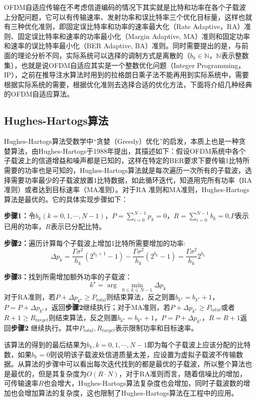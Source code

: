 OFDM自适应传输在不考虑信道编码的情况下其实就是比特和功率在各个子载波上分配问题，它可以有传输速率、发射功率和误比特率三个优化目标量，这样也就有三种优化准则，即固定误比特率和功率的速率最大化（Rate Adaptive，RA）准则、固定误比特率和速率的功率最小化（Margin Adaptive, MA）准则和固定功率和速率的误比特率最小化（BER Adaptive, BA）准则。同时需要提出的是，与前面的理论分析不同，实际系统可以选择的调制方式是离散的（$b_k \in \mathbb{N}$，$\mathbb{N}$表示整数集），也就是说OFDM自适应其实是一个整数优化问题（Integer Programming，IP），之前在推导注水算法时用到的拉格朗日乘子法不能再用到实际系统中，需要根据实际系统的需要，根据优化准则去选择合适的优化方法，下面将介绍几种经典的OFDM自适应算法。
\subsection{Hughes-Hartogs算法}
Hughes-Hartogs算法\cite{hughes1989ensemble}受数学中“贪婪（Greedy）优化”的启发，本质上也是一种贪婪算法，由Hughes-Hartogs于1988年提出，其描述如下：假设OFDM系统中各个子载波上的信道增益和噪声都是已知的，这样在特定的BER要求下要传输1比特所需要的功率也是可知的，Hughes-Hartogs算法就是每次遍历一次所有的子载波，选择需要功率最少的子载波放置1比特数据，如此循环迭代，知道用完所有功率（RA准则）或者达到目标速率（MA准则）。对于RA 准则和MA准则，Hughes-Hartogs算法是最优的。它的具体实现步骤如下：
\begin{description}
\item{\bf{步骤1：}}令$b_k(k=0,1,\cdots,N-1)$，$P=\sum_{i=0}^{N-1}p_k=0$，$R=\sum_{i=0}^{N-1}b_k=0$,$P$表示已用的功率，$R$表示已分配比特。
\item{\bf{步骤2：}}遍历计算每个子载波上增加1比特所需要增加的功率:
\begin{equation}
\Delta p_k=\frac{\Gamma\sigma^2}{h_k}(2^{b_k+1}-1)-\frac{\Gamma\sigma^2}{h_k}(2^{b_k}-1)=\frac{\Gamma\sigma^2}{h_k}2^{b_k}
\end{equation}
\item{\bf{步骤3：}}找到所需增加额外功率的子载波：
\begin{equation}
k^{\star} = \arg\ \underset{0\leq k \leq N-1}{\min}\Delta p_k
\end{equation}
对于RA准则，若$P+\Delta p_{k^\star}\geq P_{total}$则结束算法，反之则置$b_{k^\star}=b_{k^\star}+1$，$P=P+\Delta p_{k^\star}$，返回\textbf{步骤2}继续执行；对于MA准则，若$P+\Delta p_{k^\star}\geq P_{total}$或者$R+1\geq R_{target}$则结束算法，反之则置$b_{k^\star}=b_{k^\star}+1$，$P=P+\Delta p_{k^\star}$，$R=R+1$返回\textbf{步骤2} 继续执行。其中$P_{total}, R_{target}$表示限制功率和目标速率。
\end{description}
该算法的得到的最后结果为$b_k, k=0,1,\cdots,N-1$即为每个子载波上应该分配的比特数，如果$b_k=0$则说明该子载波处信道质量太差，应设置为虚拟子载波不传输数据。从算法的步骤中可以看出每次迭代找到的都是最优的子载波，所以整个算法也是最优的，但是其复杂度为$O(R\cdot N)$，对于RA准则而言，随着信噪比的增加，可传输速率$R$也会增大，Hughes-Hartogs算法复杂度也会增加，同时子载波数的增加也会增加算法的复杂度，这也限制了Hughes-Hartogs算法在工程中的应用。
